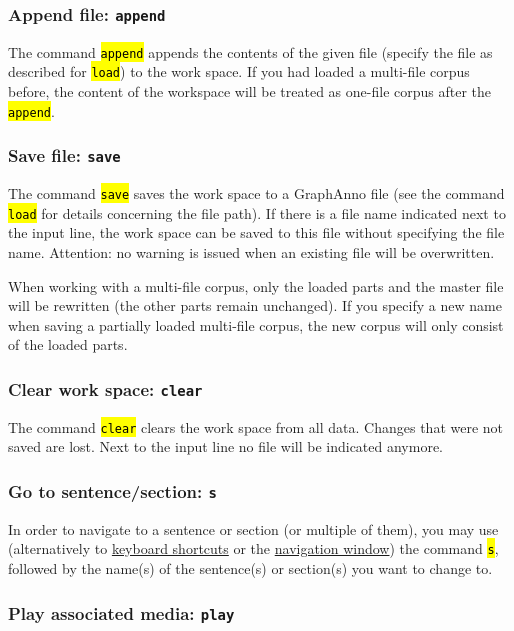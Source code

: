 \documentclass[12pt]{scrartcl}
\newcommand{\code}[1]{\hl{\texttt{#1}}}
\begin{document}
\subsubsection{Append file: \texttt{append}}

The command \code{append} appends the contents of the given file (specify the file as described for \code{load}) to the work space.
If you had loaded a multi-file corpus before, the content of the workspace will be treated as one-file corpus after the \code{append}.


\subsubsection{Save file: \texttt{save}}

The command \code{save} saves the work space to a GraphAnno file (see the command \code{load} for details concerning the file path).
If there is a file name indicated next to the input line, the work space can be saved to this file without specifying the file name.
Attention: no warning is issued when an existing file will be overwritten.

When working with a multi-file corpus, only the loaded parts and the master file will be rewritten (the other parts remain unchanged).
If you specify a new name when saving a partially loaded multi-file corpus, the new corpus will only consist of the loaded parts.


\subsubsection{Clear work space: \texttt{clear}}

The command \code{clear} clears the work space from all data.
Changes that were not saved are lost.
Next to the input line no file will be indicated anymore.


\subsubsection{Go to sentence/section: \texttt{s}}\label{befehl-s}

In order to navigate to a sentence or section (or multiple of them), you may use (alternatively to \hyperref[shortcuts]{keyboard shortcuts} or the \hyperref[window-navigation]{navigation window}) the command \code{s}, followed by the name(s) of the sentence(s) or section(s) you want to change to.


\subsubsection{Play associated media: \texttt{play}}\label{befehl-play}
\end{document}
